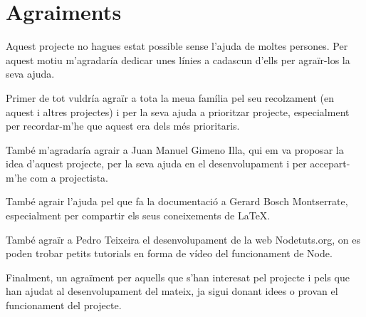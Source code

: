 \chapter*{Agraiments}

Aquest projecte no hagues estat possible sense l'ajuda de moltes persones. Per aquest motiu m'agradaría dedicar unes línies a cadascun d'ells per agraïr-los la seva ajuda.

Primer de tot vuldría agraïr a tota la meua família pel seu recolzament (en aquest i altres projectes) i per la seva ajuda a prioritzar projecte, especialment per recordar-m'he que aquest era dels més prioritaris. 

També m'agradaría agrair a Juan Manuel Gimeno Illa, qui em va proposar la idea d'aquest projecte, per la seva ajuda en el desenvolupament i per accepart-m'he com a projectista. 

També agrair l'ajuda pel que fa la documentació a Gerard Bosch Montserrate, especialment per compartir els seus coneixements de LaTeX.

També agraïr a Pedro Teixeira el desenvolupament de la web Nodetuts.org, on es poden trobar petits tutorials en forma de vídeo del funcionament de Node.

Finalment, un agraïment per aquells que s'han interesat pel projecte i pels que han ajudat al desenvolupament del mateix, ja sigui donant idees o provan el funcionament del projecte. 

